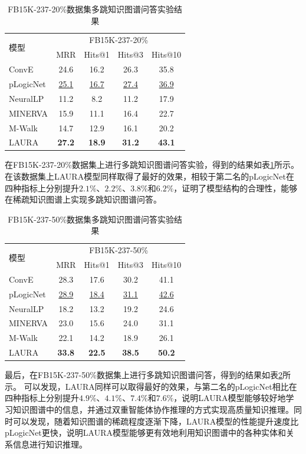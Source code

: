 \documentclass[algorithmlist, AutoFakeBold, AutoFakeSlant, figurelist, tablelist, nomlist, engineering]{seuthesix}
\begin{document}
\begin{table}[t]
  \centering
  \caption{FB15K-237-20\%数据集多跳知识图谱问答实验结果}
  \begin{tabular*}{0.95\textwidth}{@{\extracolsep{\fill}}lcccc}
    \toprule[1pt]
    \multirow{2}{*}{模型} & \multicolumn{4}{c}{FB15K-237-20\%}   \\
      & MRR & Hits@1 & Hits@3 & Hits@10 \\ \hline
    ConvE & 24.6 & 16.2 & 26.3 & 35.8 \\
    pLogicNet & \underline{25.1} & \underline{16.7} & \underline{27.4} & \underline{36.9} \\
    NeuralLP & 11.2 & 8.2 & 11.2 & 17.9 \\
    MINERVA & 15.9 & 11.1 & 16.4 & 22.7 \\
    M-Walk & 14.7 & 12.9 & 16.1 & 20.2 \\
    LAURA & \textbf{27.2} & \textbf{18.9} & \textbf{31.2} & \textbf{43.1} \\
    \bottomrule[1pt]
  \end{tabular*}
  \label{Experiment2_FB15K-237-20}
\end{table}
在FB15K-237-20\%数据集上进行多跳知识图谱问答实验，得到的结果如表\ref{Experiment2_FB15K-237-20}所示。
在该数据集上LAURA模型同样取得了最好的效果，相较于第二名的pLogicNet在四种指标上分别提升$2.1\%$、$2.2\%$、$3.8\%$和$6.2\%$，证明了模型结构的合理性，能够在稀疏知识图谱上实现多跳知识图谱问答。

\begin{table}[t]
  \centering
  \caption{FB15K-237-50\%数据集多跳知识图谱问答实验结果}
  \begin{tabular*}{0.95\textwidth}{@{\extracolsep{\fill}}lcccc}
    \toprule[1pt]
    \multirow{2}{*}{模型} & \multicolumn{4}{c}{FB15K-237-50\%}   \\
      & MRR & Hits@1 & Hits@3 & Hits@10 \\ \hline
    ConvE & 28.3 & 17.6 & 30.2 & 41.1 \\
    pLogicNet & \underline{28.9} & \underline{18.4} & \underline{31.1} & \underline{42.6} \\
    NeuralLP & 18.2 & 13.2 & 19.2 & 24.6 \\
    MINERVA & 23.0 & 15.6 & 24.0 & 31.1 \\
    M-Walk & 22.1 & 14.2 & 18.9 & 26.1 \\
    LAURA & \textbf{33.8} & \textbf{22.5} & \textbf{38.5} & \textbf{50.2} \\
    \bottomrule[1pt]
  \end{tabular*}
  \label{Experiment2_FB15K-237-50}
\end{table}
最后，在FB15K-237-50\%数据集上进行多跳知识图谱问答，得到的结果如表\ref{Experiment2_FB15K-237-50}所示。
可以发现，LAURA同样可以取得最好的效果，与第二名的pLogicNet相比在四种指标上分别提升$4.9\%$、$4.1\%$、$7.4\%$和$7.6\%$，说明LAURA模型能够较好地学习知识图谱中的信息，并通过双重智能体协作推理的方式实现高质量知识推理。同时可以发现，随着知识图谱的稀疏程度逐渐下降，LAURA模型的性能提升速度比pLogicNet更快，说明LAURA模型能够更有效地利用知识图谱中的各种实体和关系信息进行知识推理。
\end{document}
